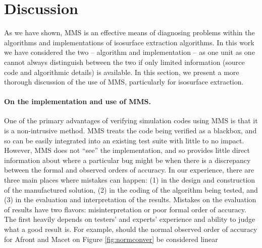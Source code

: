 \section{Discussion}
\label{chap1:sec:dis}

As we have shown, MMS is an effective means of diagnosing problems within 
the algorithms and implementations of isosurface extraction algorithms. 
In this work we have considered the two -- algorithm and implementation --
as one unit as one cannot always distinguish between the two if only
limited information (source code and algorithmic details) is 
available.  In this section, we present a more thorough discussion 
of the use of MMS, particularly for isosurface extraction.

\paragraph*{On the implementation and use of MMS.}
One of the primary advantages of verifying simulation codes using MMS
is that it is a non-intrusive method. MMS treats the code being
verified as a blackbox, and so can be easily integrated into an existing
test suite with little to no impact.
%
%
However, MMS does not ``see'' the implementation, and so provides
little direct information about where a particular bug might be when there
is a discrepancy between the formal and observed orders of accuracy.
In our experience, there are three main places where mistakes can happen: (1) in
the design and construction of the manufactured solution, (2) in the coding of the
algorithm being tested, and (3) in the evaluation and interpretation
of the results. Mistakes on the evaluation of results have two flavors:
misinterpretation or poor formal order of accuracy. The first heavily
depends on testers' and experts' experience and ability to judge what
a good result is. For example, should the normal observed order of accuracy for
Afront and Macet on Figure \ref{fig:normconver} be considered linear
